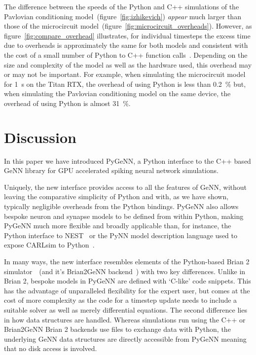 \documentclass[utf8]{frontiersSCNS} %
\begin{document}
The difference between the speeds of the Python and C++ simulations of the Pavlovian conditioning model~(figure~\ref{fig:izhikevich}) \emph{appear} much larger than those of the microcircuit model~(figure~\ref{fig:microcircuit_overheads}).
However, as figure~\ref{fig:compare_overhead} illustrates, for individual timesteps the excess time due to overheads is approximately the same for both models and consistent with the cost of a small number of Python to C++ function calls~\citep{Crail2019}.
Depending on the size and complexity of the model as well as the hardware used, this overhead may or may not be important.
For example, when simulating the microcircuit model for \SI{1}{\second} on the Titan RTX, the overhead of using Python is less than \SI{0.2}{\percent} but, when simulating the Pavlovian conditioning model on the same device, the overhead of using Python is almost \SI{31}{\percent}.

\section{Discussion}
In this paper we have introduced PyGeNN, a Python interface to the C++ based GeNN library for GPU accelerated spiking neural network simulations.

Uniquely, the new interface provides access to all the features of GeNN, without leaving the comparative simplicity of Python and with, as we have shown, typically negligible overheads from the Python bindings.
PyGeNN also allows bespoke neuron and synapse models to be defined from within Python, making PyGeNN much more flexible and broadly applicable than, for instance, the Python interface to NEST~\citep{Eppler2009} or the PyNN model description language used to expose CARLsim to Python~\citep{Balaji2020}.

In many ways, the new interface resembles elements of the Python-based Brian 2 simulator~\citep{Stimberg2019}~(and it's Brian2GeNN backend~\citep{Stimberg2020}) with two key differences.
Unlike in Brian 2, bespoke models in PyGeNN are defined with `C-like' code snippets. 
This has the advantage of unparalleled flexibility for the expert user, but comes at the cost of more complexity as the code for a timestep update needs to include a suitable solver as well as merely differential equations.
The second difference lies in how data structures are handled. 
Whereas simulations run using the C++ or Brian2GeNN Brian 2 backends use files to exchange data with Python, the underlying GeNN data structures are directly accessible from PyGeNN meaning that no disk access is involved.
\end{document}
